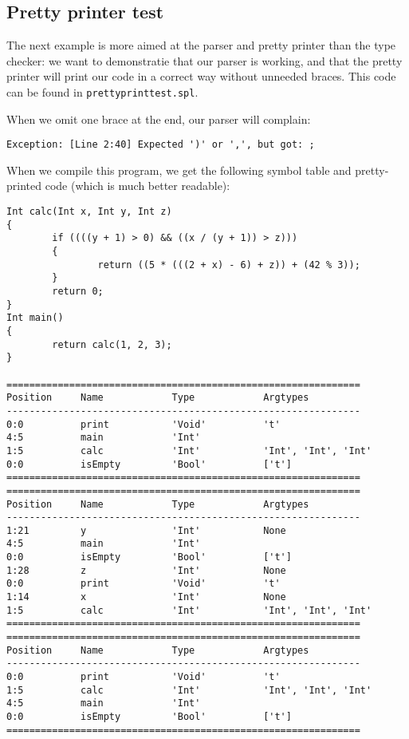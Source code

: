 \documentclass[a4paper]{article}
\begin{document}
\subsection{Pretty printer test}
The next example is more aimed at the parser and pretty printer than the type checker: we want to demonstratie that our parser is working, and that the pretty printer will print our code in a correct way without unneeded braces. This code can be found in {\tt prettyprinttest.spl}.

When we omit one brace at the end, our parser will complain:
\begin{verbatim}
Exception: [Line 2:40] Expected ')' or ',', but got: ;
\end{verbatim}

When we compile this program, we get the following symbol table and pretty-printed code (which is much better readable):
\begin{verbatim}
Int calc(Int x, Int y, Int z)
{
        if ((((y + 1) > 0) && ((x / (y + 1)) > z)))
        {
                return ((5 * (((2 + x) - 6) + z)) + (42 % 3));
        }
        return 0;
}
Int main()
{
        return calc(1, 2, 3);
}

==============================================================
Position     Name            Type            Argtypes            
--------------------------------------------------------------
0:0          print           'Void'          't'                 
4:5          main            'Int'                               
1:5          calc            'Int'           'Int', 'Int', 'Int' 
0:0          isEmpty         'Bool'          ['t']               
==============================================================
==============================================================
Position     Name            Type            Argtypes            
--------------------------------------------------------------
1:21         y               'Int'           None                
4:5          main            'Int'                               
0:0          isEmpty         'Bool'          ['t']               
1:28         z               'Int'           None                
0:0          print           'Void'          't'                 
1:14         x               'Int'           None                
1:5          calc            'Int'           'Int', 'Int', 'Int' 
==============================================================
==============================================================
Position     Name            Type            Argtypes            
--------------------------------------------------------------
0:0          print           'Void'          't'                 
1:5          calc            'Int'           'Int', 'Int', 'Int' 
4:5          main            'Int'                               
0:0          isEmpty         'Bool'          ['t']               
==============================================================
\end{verbatim}
\end{document}
